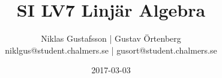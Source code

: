 \documentclass{article}
\title{SI LV7 Linjär Algebra}
\author{Niklas Gustafsson | Gustav Örtenberg  \\ \small{niklgus@student.chalmers.se} | \small{gusort@student.chalmers.se}}
\date{2017-03-03}
\begin{document}
\maketitle
\section{}


\section{}


\section{}

\newpage
\section{}


\section{}


\section{}

\end{document}
